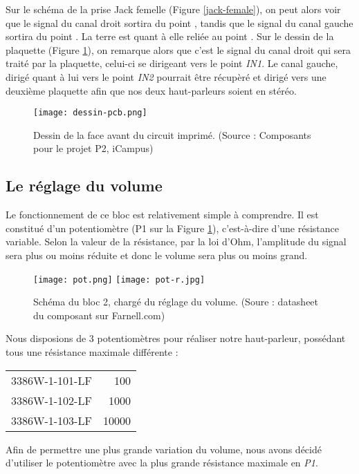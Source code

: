 Sur le schéma de la prise Jack femelle (Figure \ref{jack-female}), on peut alors
voir que le signal du canal droit sortira du point , tandis que le signal du 
canal gauche sortira du point . La terre est quant à elle reliée au point
. Sur le dessin de la plaquette (Figure \ref{dessin-pcb}), on remarque alors
que c'est le signal du canal droit qui sera traité par la plaquette, celui-ci se dirigeant vers
le point \textit{IN1}. Le canal gauche, dirigé quant à lui vers le point \textit{IN2} pourrait
être récupèré et dirigé vers une deuxième plaquette afin que nos deux haut-parleurs soient en stéréo.

\begin{figure}[!hbt]
	\centering
	\texttt{[image: dessin-pcb.png]}
	\caption{Dessin de la face avant du circuit imprimé. (Source : Composants pour le projet P2, iCampus)}
	\label{dessin-pcb}
\end{figure}

\subsection{Le réglage du volume}
Le fonctionnement de ce bloc est relativement simple à comprendre. Il est constitué d'un potentiomètre 
(P1 sur la Figure \ref{dessin-pcb}), c'est-à-dire d'une résistance variable.
Selon la valeur de la résistance, par la loi d'Ohm, l'amplitude du signal
sera plus ou moins réduite et donc le volume sera plus ou moins grand.

\begin{figure}[h]
	\centering
	\texttt{[image: pot.png]}
	\texttt{[image: pot-r.jpg]}
	\caption{Schéma du bloc 2, chargé du réglage du volume. (Soure : datasheet du composant sur Farnell.com)}
	\label{bloc2}
\end{figure}

Nous disposions de 3 potentiomètres pour réaliser notre haut-parleur, possédant
tous une résistance maximale différente :

\begin{center}
	\begin{tabular}{l|r}
	3386W-1-101-LF & \unit{100}{\ohm} \\
	3386W-1-102-LF & \unit{1000}{\ohm} \\
	3386W-1-103-LF & \unit{10000}{\ohm} 
	\end{tabular}
\end{center}

Afin de permettre une plus grande variation du volume, nous avons décidé d'utiliser
le potentiomètre avec la plus grande résistance maximale en \textit{P1}.

